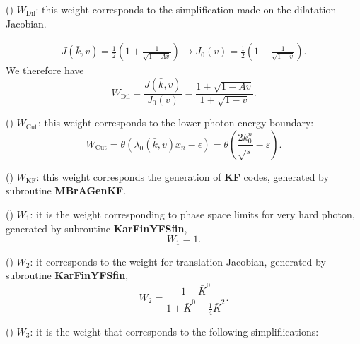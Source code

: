   () $W_\text{Dil}$: this weight corresponds to the simplification made on the dilatation Jacobian.

\begin{align}
 J(\bar{k},v)=\frac{1}{2}\left(1+\frac{1}{\sqrt {1-Av}}\right) \longrightarrow
 J_0(v)=\frac{1}{2}\left(1+\frac{1}{\sqrt{1-v}}\right).
\end{align}
We therefore have
 \begin{equation}
 W_\text{Dil}=\frac{J(\bar{k},v)}{J_0(v)}=\frac{1+\sqrt{1-Av}}{1+\sqrt{1-v}}.
 \end{equation}


   () $W_\text{Cut}$: this weight corresponds to the lower photon energy boundary:
 \begin{equation}
 W_\text{Cut} = \theta\left(\lambda_0(\bar{k},v)x_n-\epsilon\right)=  \theta\left(\frac{2k^n_0}{\sqrt{s}}-\varepsilon\right).
 \end{equation}
 
  () $W_\text{KF}$: this weight corresponds the generation of \textbf{KF} codes, generated by subroutine \textbf{MBrA\textunderscore GenKF}.

 () $W_1$: it is the weight corresponding to phase space limits for very hard photon, generated by subroutine \textbf{KarFin\textunderscore YFSfin},
 \begin{equation}
 W_1 = 1.
 \end{equation}

  () $W_2$: it corresponds to the weight for translation Jacobian, generated by subroutine \textbf{KarFin\textunderscore YFSfin},
 \begin{equation}
 W_2=\frac{1+\bar{K}^0}{1+\bar{K}^0+\frac{1}{4}\bar{K}^2}.
 \end{equation}


 () $W_3$: it is the weight that corresponds to the following simplifiications: 

